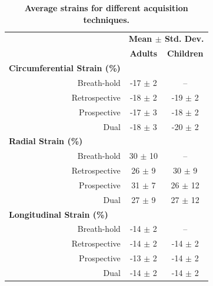 \begin{table}
	\centering
	\caption[Average strains for different acquisition techniques]{\textbf{Average strains for different acquisition techniques.}}
	\label{table:navigator_strains}
	\begin{tabular}{c  c  c}
		\toprule
		\multicolumn{1}{c}{}       			 & \multicolumn{2}{c}{\textbf{Mean $\pm$ Std. Dev.}} \\ 
		\multicolumn{1}{c}{}				 & \multicolumn{1}{c}{\textbf{Adults}} 			& \multicolumn{1}{c}{\textbf{Children}} \\ \midrule
		\multicolumn{1}{l}{\textbf{Circumferential Strain (\%)}}                       		& \multicolumn{2}{c}{} \\
		\multicolumn{1}{r}{Breath-hold}      & \multicolumn{1}{c}{-17 $\pm$ 2}              & \multicolumn{1}{c}{--}          			\\
		\multicolumn{1}{r}{Retrospective}    & \multicolumn{1}{c}{-18 $\pm$ 2}              & \multicolumn{1}{c}{-19 $\pm$ 2}           \\
		\multicolumn{1}{r}{Prospective}      & \multicolumn{1}{c}{-17 $\pm$ 3}              & \multicolumn{1}{c}{-18 $\pm$ 2}           \\
		\multicolumn{1}{r}{Dual}    		 & \multicolumn{1}{c}{-18 $\pm$ 3}              & \multicolumn{1}{c}{-20 $\pm$ 2}           \\
		\multicolumn{1}{l}{\textbf{Radial Strain (\%)}}                       				& \multicolumn{2}{c}{} \\
		\multicolumn{1}{r}{Breath-hold}      & \multicolumn{1}{c}{30 $\pm$ 10}              & \multicolumn{1}{c}{--}          			\\
		\multicolumn{1}{r}{Retrospective}    & \multicolumn{1}{c}{26 $\pm$ 9}               & \multicolumn{1}{c}{30 $\pm$ 9}           \\
		\multicolumn{1}{r}{Prospective}      & \multicolumn{1}{c}{31 $\pm$ 7}               & \multicolumn{1}{c}{26 $\pm$ 12}           \\
		\multicolumn{1}{r}{Dual}		     & \multicolumn{1}{c}{27 $\pm$ 9}               & \multicolumn{1}{c}{27 $\pm$ 12}           \\
		\multicolumn{1}{l}{\textbf{Longitudinal Strain (\%)}}                       		& \multicolumn{2}{c}{} \\
		\multicolumn{1}{r}{Breath-hold}      & \multicolumn{1}{c}{-14 $\pm$ 2}              & \multicolumn{1}{c}{--}          			\\
		\multicolumn{1}{r}{Retrospective}    & \multicolumn{1}{c}{-14 $\pm$ 2}              & \multicolumn{1}{c}{-14 $\pm$ 2}           \\
		\multicolumn{1}{r}{Prospective}      & \multicolumn{1}{c}{-13 $\pm$ 2}              & \multicolumn{1}{c}{-14 $\pm$ 2}           \\
		\multicolumn{1}{r}{Dual}		     & \multicolumn{1}{c}{-14 $\pm$ 2}              & \multicolumn{1}{c}{-14 $\pm$ 2}           \\
		\bottomrule                                                 
	\end{tabular}
\end{table}

